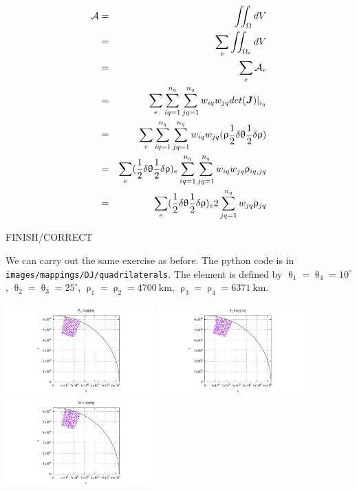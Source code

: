 \begin{eqnarray}
{\cal A}
&=&\iint_\Omega dV  \nonumber\\
&=&\sum_e \iint_{\Omega_e} dV  \nonumber\\
&=&\sum_e {\cal A}_e   \nonumber\\
&=&\sum_e \sum_{iq=1}^{n_q} \sum_{jq=1}^{n_q}   w_{iq} w_{jq} det({\bm J})|_{i_q} \nonumber\\
&=&\sum_e \sum_{iq=1}^{n_q} \sum_{jq=1}^{n_q}   w_{iq} w_{jq} (\uprho  \frac12 \delta \uptheta  \frac12 \delta\uprho ) \nonumber\\
&=&\sum_e  (\frac12 \delta \uptheta  \frac12 \delta\uprho)_e  \sum_{iq=1}^{n_q} \sum_{jq=1}^{n_q}   w_{iq} w_{jq} \uprho_{iq,jq} \nonumber\\
&=&\sum_e  (\frac12 \delta \uptheta  \frac12 \delta\uprho)_e  2  \sum_{jq=1}^{n_q}  w_{jq} \uprho_{jq} \nonumber\\
\end{eqnarray}

FINISH/CORRECT


\newpage 
We can carry out the same exercise as before.
The python code is in {\tt images/mappings/DJ/quadrilaterals}.
The element is defined by 
$\uptheta_1=\uptheta_4=10^\circ$,
$\uptheta_2=\uptheta_3=25^\circ$,
$\uprho_1=\uprho_2=4700~\si{\km}$,
$\uprho_3=\uprho_4=6371~\si{\km}$.

\begin{center}
\includegraphics[width=5.7cm]{images/mappings/DJ/quadrilaterals/xz_P1.pdf}
\includegraphics[width=5.7cm]{images/mappings/DJ/quadrilaterals/xz_P2.pdf}
\includegraphics[width=5.7cm]{images/mappings/DJ/quadrilaterals/xz_DJ.pdf}
\end{center}

